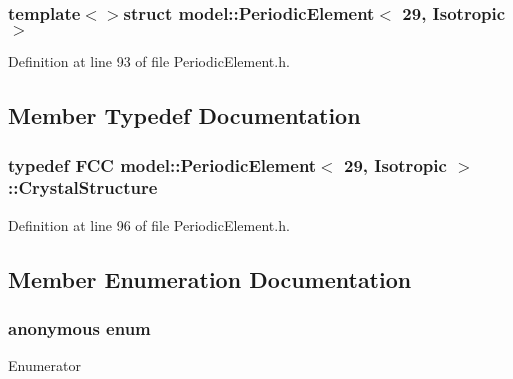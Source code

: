 \subsubsection*{template$<$$>$struct model\+::\+Periodic\+Element$<$ 29, Isotropic $>$}



Definition at line 93 of file Periodic\+Element.\+h.



\subsection{Member Typedef Documentation}
\hypertarget{structmodel_1_1_periodic_element_3_0129_00_01_isotropic_01_4_a938a6702975c58e5d6c07f05ba239913}{}
\subsubsection[{Crystal\+Structure}]{\setlength{\rightskip}{0pt plus 5cm}typedef {\bf F\+C\+C} {\bf model\+::\+Periodic\+Element}$<$ 29, {\bf Isotropic} $>$\+::{\bf Crystal\+Structure}}\label{structmodel_1_1_periodic_element_3_0129_00_01_isotropic_01_4_a938a6702975c58e5d6c07f05ba239913}


Definition at line 96 of file Periodic\+Element.\+h.



\subsection{Member Enumeration Documentation}
\hypertarget{structmodel_1_1_periodic_element_3_0129_00_01_isotropic_01_4_a7e55d3986aadabe6e222b0f2ee82dd28}{}\subsubsection[{anonymous enum}]{\setlength{\rightskip}{0pt plus 5cm}anonymous enum}\label{structmodel_1_1_periodic_element_3_0129_00_01_isotropic_01_4_a7e55d3986aadabe6e222b0f2ee82dd28}
\begin{Desc}
\item[Enumerator]\par
\begin{description}
\item[{\em 
\hypertarget{structmodel_1_1_periodic_element_3_0129_00_01_isotropic_01_4_a7e55d3986aadabe6e222b0f2ee82dd28a6f9f6967dea6ff534719c7c0a8e944f7}{}Z\label{structmodel_1_1_periodic_element_3_0129_00_01_isotropic_01_4_a7e55d3986aadabe6e222b0f2ee82dd28a6f9f6967dea6ff534719c7c0a8e944f7}
}]\end{description}
\end{Desc}


